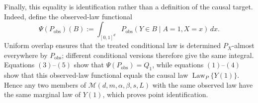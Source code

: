 Finally, this equality is identification rather than a definition of the causal target.  Indeed, define the observed-law functional
\[
 \Psi(P_{\mathrm{obs}})(B)
 :=\int_{[0,1]^d}P_{\mathrm{obs}}(Y\in B\mid A=1,X=x)\,dx.
\]
Uniform overlap ensures that the treated conditional law is determined \(P_X\)-almost everywhere by \(P_{\mathrm{obs}}\); different conditional versions therefore give the same integral.  Equations \((3)\)--\((5)\) show that \(\Psi(P_{\mathrm{obs}})=Q_1\), while equations \((1)\)--\((4)\) show that this observed-law functional equals the causal law \(\operatorname{Law}_P\{Y(1)\}\).  Hence any two members of \(\mathcal M(d,m,\alpha,\beta,s,L)\) with the same observed law have the same marginal law of \(Y(1)\), which proves point identification.
